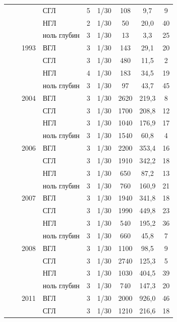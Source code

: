 \begin{footnotesize}
\begin{longtable}{|p{2cm}|p{3cm}|p{1cm}|p{2cm}|p{1.5cm}|p{1cm}|*{3}{c|}}
		\\ \cline{4-9}
		 &  &  & СГЛ & 5 & 1/30 & 108 & 9,7 & 9
		\\ \cline{4-9}
		 &  &  & НГЛ & 2 & 1/30 & 50 & 20,0 & 40
		\\ \cline{4-9}
		 &  &  & ноль глубин & 3 & 1/30 & 13 & 3,3 & 25
		\\ \cline{3-9}
		 &  & 1993 & ВГЛ & 3 & 1/30 & 143 & 29,1 & 20
		\\ \cline{4-9}
		 &  &  & СГЛ & 3 & 1/30 & 480 & 11,5 & 2
		\\ \cline{4-9}
		 &  &  & НГЛ & 4 & 1/30 & 183 & 34,5 & 19
		\\ \cline{4-9}
		 &  &  & ноль глубин & 3 & 1/30 & 97 & 43,7 & 45
		\\ \cline{3-9}
		 &  & 2004 & ВГЛ & 3 & 1/30 & 2620 & 219,3 & 8
		\\ \cline{4-9}
		 &  &  & СГЛ & 3 & 1/30 & 1700 & 208,8 & 12
		\\ \cline{4-9}
		 &  &  & НГЛ & 3 & 1/30 & 1040 & 176,9 & 17
		\\ \cline{4-9}
		 &  &  & ноль глубин & 3 & 1/30 & 1540 & 60,8 & 4
		\\ \cline{3-9}
		 &  & 2006 & ВГЛ & 3 & 1/30 & 2200 & 353,4 & 16
		\\ \cline{4-9}
		 &  &  & СГЛ & 3 & 1/30 & 1910 & 342,2 & 18
		\\ \cline{4-9}
		 &  &  & НГЛ & 3 & 1/30 & 650 & 87,2 & 13
		\\ \cline{4-9}
		 &  &  & ноль глубин & 3 & 1/30 & 760 & 160,9 & 21
		\\ \cline{3-9}
		 &  & 2007 & ВГЛ & 3 & 1/30 & 1940 & 341,8 & 18
		\\ \cline{4-9}
		 &  &  & СГЛ & 3 & 1/30 & 1990 & 449,8 & 23
		\\ \cline{4-9}
		 &  &  & НГЛ & 3 & 1/30 & 540 & 195,2 & 36
		\\ \cline{4-9}
		 &  &  & ноль глубин & 3 & 1/30 & 660 & 45,8 & 7
		\\ \cline{3-9}
		 &  & 2008 & ВГЛ & 3 & 1/30 & 1100 & 98,5 & 9
		\\ \cline{4-9}
		 &  &  & СГЛ & 3 & 1/30 & 2740 & 125,3 & 5
		\\ \cline{4-9}
		 &  &  & НГЛ & 3 & 1/30 & 1030 & 404,5 & 39
		\\ \cline{4-9}
		 &  &  & ноль глубин & 3 & 1/30 & 740 & 147,3 & 20
		\\ \cline{3-9}
		 &  & 2011 & ВГЛ & 3 & 1/30 & 2000 & 926,0 & 46
		\\ \cline{4-9}
		 &  &  & СГЛ & 3 & 1/30 & 1210 & 216,6 & 18

\end{longtable}
\end{footnotesize}
